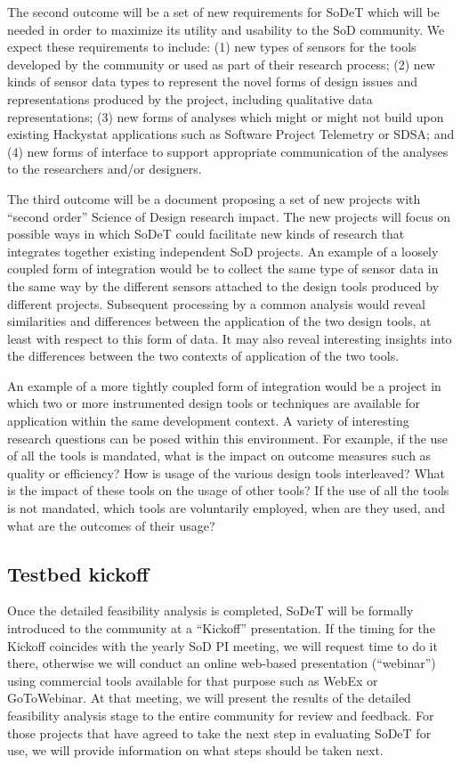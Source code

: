 The second outcome will be a set of new requirements for SoDeT
which will be needed in order to maximize its utility and usability to the
SoD community.  We expect these requirements to include: (1) new types of
sensors for the tools developed by the community or used as part of their
research process; (2) new kinds of sensor data types to represent the novel
forms of design issues and representations produced by the project,
including qualitative data representations; (3) new forms of analyses which
might or might not build upon existing Hackystat applications such as
Software Project Telemetry or SDSA; and (4) new forms of interface to
support appropriate communication of the analyses to the researchers and/or
designers.

The third outcome will be a document proposing a set of new projects with
``second order'' Science of Design research impact.  The new projects will
focus on possible ways in which SoDeT could facilitate new
kinds of research that integrates together existing independent SoD
projects.  An example of a loosely coupled form of integration would be to
collect the same type of sensor data in the same way by the different
sensors attached to the design tools produced by different projects.
Subsequent processing by a common analysis would reveal similarities and
differences between the application of the two design tools, at least with
respect to this form of data.  It may also reveal interesting insights into
the differences between the two contexts of application of the two tools.

An example of a more tightly coupled form of integration would be a project
in which two or more instrumented design tools or techniques are available
for application within the same development context.  A variety of
interesting research questions can be posed within this environment. For
example, if the use of all the tools is mandated, what is the impact on
outcome measures such as quality or efficiency?  How is usage of the
various design tools interleaved?  What is the impact of these tools on the
usage of other tools?  If the use of all the tools is not mandated, which
tools are voluntarily employed, when are they used, and what are the
outcomes of their usage?  

\subsection{Testbed kickoff}

Once the detailed feasibility analysis is completed, SoDeT will
be formally introduced to the community at a ``Kickoff'' presentation.  If
the timing for the Kickoff coincides with the yearly SoD PI meeting, we
will request time to do it there, otherwise we will conduct an online
web-based presentation (``webinar'') using commercial tools available for
that purpose such as WebEx or GoToWebinar.  At that meeting, we will
present the results of the detailed feasibility analysis stage to the
entire community for review and feedback.  For those projects that have
agreed to take the next step in evaluating SoDeT for use, we will provide
information on what steps should be taken next. 

